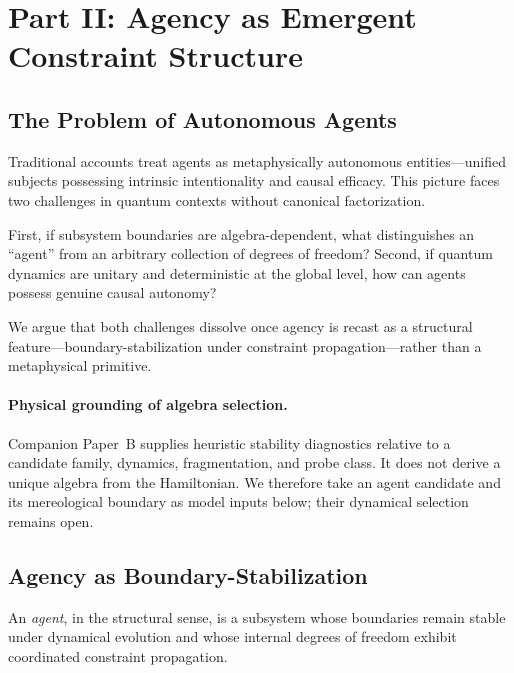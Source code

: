 \documentclass[12pt,a4paper,openany]{book}
\begin{document}
\section{Part II: Agency as Emergent Constraint Structure}
\label{C-sec:agency}

\subsection{The Problem of Autonomous Agents}
\label{C-sec:II.1}

Traditional accounts treat agents as metaphysically autonomous entities—unified subjects possessing intrinsic intentionality and causal efficacy. This picture faces two challenges in quantum contexts without canonical factorization.

First, if subsystem boundaries are algebra-dependent, what distinguishes an ``agent'' from an arbitrary collection of degrees of freedom? Second, if quantum dynamics are unitary and deterministic at the global level, how can agents possess genuine causal autonomy?

We argue that both challenges dissolve once agency is recast as a structural feature---boundary-stabilization under constraint propagation---rather than a metaphysical primitive.

\paragraph{Physical grounding of algebra selection.}
Companion Paper~B \cite{Liu2026PaperB} supplies heuristic stability diagnostics relative to a candidate family, dynamics, fragmentation, and probe class.  It does not derive a unique algebra from the Hamiltonian.  We therefore take an agent candidate and its mereological boundary as model inputs below; their dynamical selection remains open.

\subsection{Agency as Boundary-Stabilization}
\label{C-sec:II.2}

An \emph{agent}, in the structural sense, is a subsystem whose boundaries remain stable under dynamical evolution and whose internal degrees of freedom exhibit coordinated constraint propagation.
\end{document}
